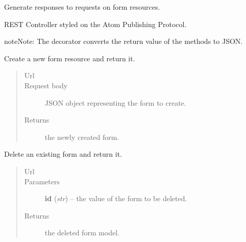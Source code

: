 \documentclass[letterpaper,10pt,english]{sphinxmanual}
\begin{document}
\begin{fulllineitems}
\label{api:onlinelinguisticdatabase.controllers.forms.FormsController}
Generate responses to requests on form resources.

REST Controller styled on the Atom Publishing Protocol.

\begin{notice}{note}{Note:}
The  decorator converts the return value of the methods to
JSON.
\end{notice}

\begin{fulllineitems}
\label{api:onlinelinguisticdatabase.controllers.forms.FormsController.create}
Create a new form resource and return it.
\begin{quote}\begin{description}
\item[{Url }] \leavevmode
{}

\item[{Request body}] \leavevmode
JSON object representing the form to create.

\item[{Returns}] \leavevmode
the newly created form.

\end{description}\end{quote}

\end{fulllineitems}


\begin{fulllineitems}
\label{api:onlinelinguisticdatabase.controllers.forms.FormsController.delete}
Delete an existing form and return it.
\begin{quote}\begin{description}
\item[{Url }] \leavevmode
{}

\item[{Parameters}] \leavevmode
\textbf{id} (\emph{str}) -- the  value of the form to be deleted.

\item[{Returns}] \leavevmode
the deleted form model.


\end{description}
\end{quote}
\end{fulllineitems}
\end{fulllineitems}
\end{document}
